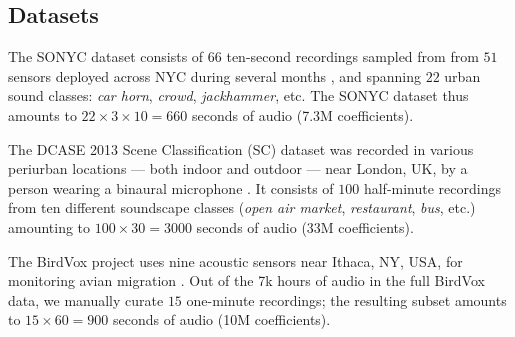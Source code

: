 \documentclass[journal]{IEEEtran}
\makeatletter
\newcommand*{\eg}{e.g.\@\xspace}
\newcommand*{\etc}{etc.\@\xspace}
\theoremstyle{remark}
\makeatother
\begin{document}
\subsection{Datasets}
The SONYC dataset consists of $66$ ten-second recordings sampled from from $51$ sensors deployed across NYC during several months \cite{bello2018cacm}, and spanning $22$ urban sound classes: \textit{car horn}, \textit{crowd}, \textit{jackhammer}, \etc{}
The SONYC dataset thus amounts to $22\times3\times10 = 660$ seconds of audio (7.3M coefficients).

The DCASE 2013 Scene Classification (SC) dataset was recorded in various periurban locations --- both indoor and outdoor --- near London, UK, by a person wearing a binaural microphone \cite{stowell2015detection}.
It consists of $100$ half-minute recordings from ten different soundscape classes (\emph{open air market}, \emph{restaurant}, \emph{bus}, etc.) amounting to $100\times30 = 3000$ seconds of audio (33M coefficients).

The BirdVox project uses nine acoustic sensors near Ithaca, NY, USA, for monitoring avian migration \cite{lostanlen2017icassp}.
Out of the 7k hours of audio in the full BirdVox data, we manually curate $15$ one-minute recordings; the resulting subset amounts to $15\times60 = 900$ seconds of audio (10M coefficients).
\end{document}
